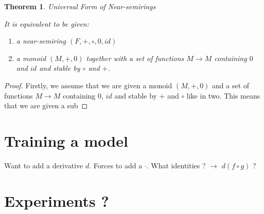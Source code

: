 \documentclass[11pt,a4paper]{article}
\newtheorem{theorem}{Theorem}
\begin{document}
\begin{theorem}{Universal Form of Near-semirings}

	It is equivalent to be given:
	
	\begin{enumerate}
	
		\item a near-semiring $(F,+,\circ,0,id)$
		
		\item a monoid $(M,+,0)$ together with a set of functions $M \to M$ containing $0$ and $id$ and stable by $\circ$ and $+$.
	
	\end{enumerate}

\end{theorem}

\begin{proof}

	Firstly, we assume that we are given a monoid $(M,+,0)$ and a set of functions $M \to M$ containing $0$, $id$ and stable by $+$ and $\circ$ like in two. This means that we are given a sub

\end{proof}

\section{Training a model}

Want to add a derivative $d$. Forces to add a $\cdot$. What identities ? $\to$ $d(f \circ g)$ ?

\section{Experiments ?}
\end{document}
